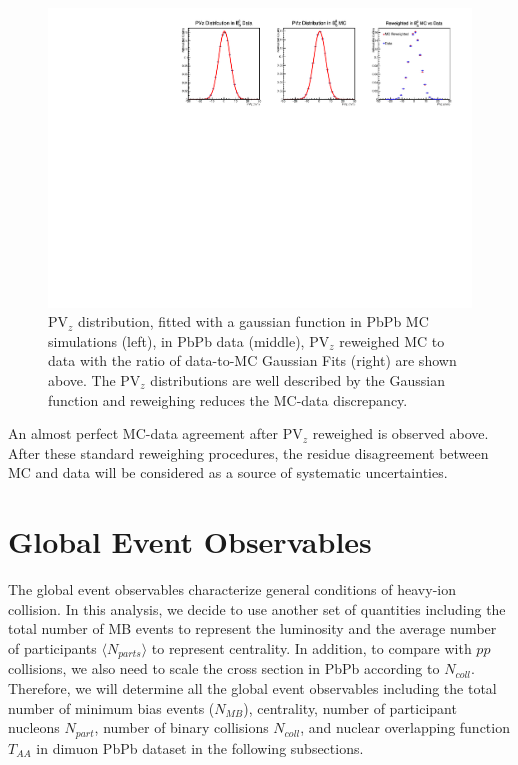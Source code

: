 \begin{figure}
\begin{center}
\includegraphics[width= 1.10\textwidth]{Figures/Chapter5/PVzWeightPbPb.pdf}
\caption{PV$_{z}$ distribution, fitted with a gaussian function in PbPb MC simulations (left), in PbPb data (middle), PV$_{z}$ reweighed MC to data with the ratio of data-to-MC Gaussian Fits (right) are shown above. The PV$_z$ distributions are well described by the Gaussian function and reweighing reduces the MC-data discrepancy.}
\label{PVZPlot}
\end{center}
\end{figure}

An almost perfect MC-data agreement after PV$_{z}$ reweighed is observed above. After these standard reweighing procedures, the residue disagreement between MC and data will be considered as a source of systematic uncertainties.


\clearpage

\section{Global Event Observables} 

The global event observables characterize general conditions of heavy-ion collision. In this analysis, we decide to use another set of quantities including the total number of MB events to represent the luminosity and the average number of participants $\langle N_{parts} \rangle$ to represent centrality. In addition, to compare with $pp$ collisions, we also need to scale the cross section in PbPb according to $N_{coll}$. Therefore, we will determine all the global event observables including the total number of minimum bias events ($N_{MB}$), centrality, number of participant nucleons $N_{part}$, number of binary collisions $N_{coll}$, and nuclear overlapping function $T_{AA}$ in dimuon PbPb dataset in the following subsections.

